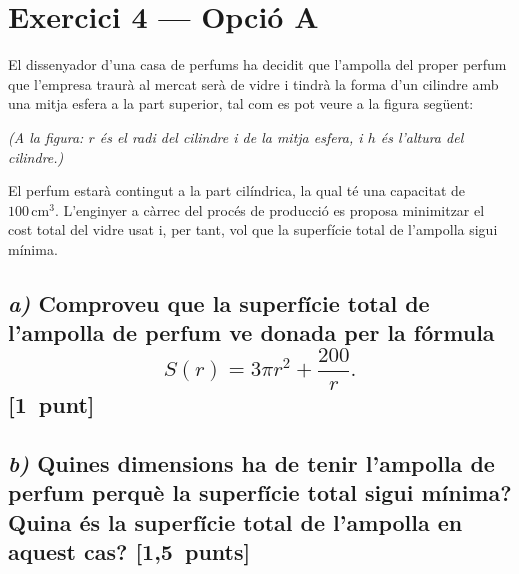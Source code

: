 \documentclass[11pt,a4paper]{article}
\begin{document}
\section*{\textcolor{blauPista}{Exercici 4 --- Opció A}}

\noindent El dissenyador d'una casa de perfums ha decidit que l'ampolla del proper perfum que l'empresa traurà al mercat serà de vidre i tindrà la forma d'un cilindre amb una mitja esfera a la part superior, tal com es pot veure a la figura següent:

\noindent\textit{(A la figura: $r$ és el radi del cilindre i de la mitja esfera, i $h$ és l'altura del cilindre.)}

\noindent El perfum estarà contingut a la part cilíndrica, la qual té una capacitat de $100\,\text{cm}^{3}$. L'enginyer a càrrec del procés de producció es proposa minimitzar el cost total del vidre usat i, per tant, vol que la superfície total de l'ampolla sigui mínima.

\subsection*{\textit{a)} \normalfont Comproveu que la superfície total de l'ampolla de perfum ve donada per la fórmula
\[
S(r) = 3\pi r^{2} + \dfrac{200}{r}.
\]
\hspace*{\fill}\textnormal{[1~punt]}}


\subsection*{\textit{b)} \normalfont Quines dimensions ha de tenir l'ampolla de perfum perquè la superfície total sigui mínima? Quina és la superfície total de l'ampolla en aquest cas? \hspace*{\fill}\textnormal{[1,5~punts]}}
\end{document}
